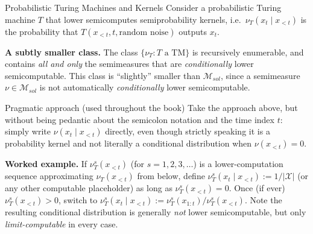 \documentclass[aspectratio=169,10pt]{beamer}
\begin{document}
\begin{frame}{Probabilistic Turing Machines and Kernels}
  Consider a probabilistic Turing machine $T$ that lower semicomputes
  semiprobability kernels, i.e.\ $\nu_T(x_t\mid x_{<t})$ is the probability
  that $T(x_{<t},t,\text{random noise})$ outputs $x_t$.

  \textbf{A subtly smaller class.} The class $\{\nu_T : T \text{ a TM}\}$ is
  recursively enumerable, and contains \emph{all and only} the semimeasures
  that are \emph{conditionally} lower semicomputable. This class is
  ``slightly'' smaller than $\mathcal{M}_{sol}$, since a semimeasure
  $\nu\in\mathcal{M}_{sol}$ is not automatically \emph{conditionally} lower
  semicomputable.

  \begin{block}{Pragmatic approach (used throughout the book)}
    Take the approach above, but without being pedantic about the semicolon
    notation and the time index $t$: simply write $\nu(x_t\mid x_{<t})$
    directly, even though strictly speaking it is a probability kernel and
    not literally a conditional distribution when $\nu(x_{<t})=0$.
  \end{block}

  \textbf{Worked example.} If $\nu_T^s(x_{<t})$ (for $s=1,2,3,\ldots$) is a
  lower-computation sequence approximating $\nu_T(x_{<t})$ from below,
  define $\nu_T^s(x_t\mid x_{<t}) := 1/|\mathcal{X}|$ (or any other
  computable placeholder) as long as $\nu_T^s(x_{<t})=0$. Once (if ever)
  $\nu_T^s(x_{<t})>0$, switch to $\nu_T^s(x_t\mid x_{<t}) :=
  \nu_T^s(x_{1:t})/\nu_T^s(x_{<t})$. Note the resulting conditional
  distribution is generally \emph{not} lower semicomputable, but only
  \emph{limit-computable} in every case.
\end{frame}
\end{document}
